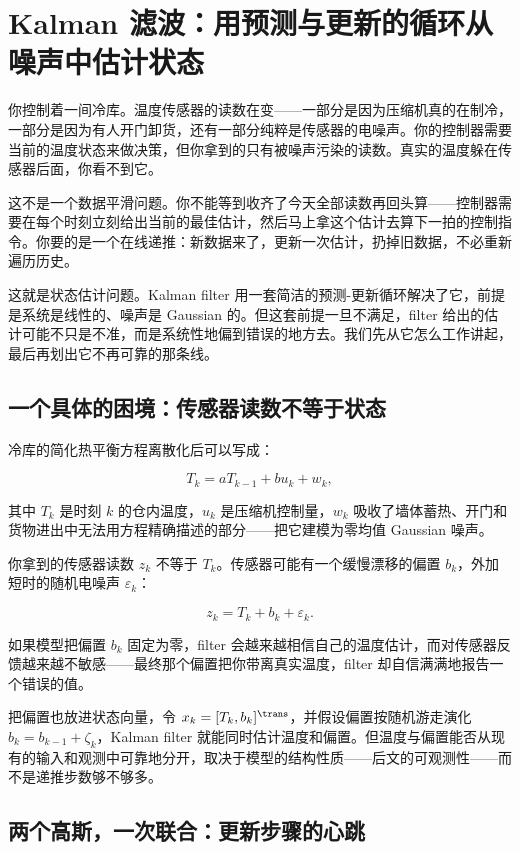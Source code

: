 \section{Kalman 滤波：用预测与更新的循环从噪声中估计状态}
\label{sec:16-Control-and-Reinforcement-Learning/01-Classical-Control/04}

你控制着一间冷库。温度传感器的读数在变——一部分是因为压缩机真的在制冷，一部分是因为有人开门卸货，还有一部分纯粹是传感器的电噪声。你的控制器需要当前的温度状态来做决策，但你拿到的只有被噪声污染的读数。真实的温度躲在传感器后面，你看不到它。

这不是一个数据平滑问题。你不能等到收齐了今天全部读数再回头算——控制器需要在每个时刻立刻给出当前的最佳估计，然后马上拿这个估计去算下一拍的控制指令。你要的是一个在线递推：新数据来了，更新一次估计，扔掉旧数据，不必重新遍历历史。

这就是状态估计问题。Kalman filter 用一套简洁的预测-更新循环解决了它，前提是系统是线性的、噪声是 Gaussian 的。但这套前提一旦不满足，filter 给出的估计可能不只是不准，而是系统性地偏到错误的地方去。我们先从它怎么工作讲起，最后再划出它不再可靠的那条线。

\subsection{一个具体的困境：传感器读数不等于状态}

冷库的简化热平衡方程离散化后可以写成：

\[
T_k = a T_{k-1} + b u_k + w_k,
\]

其中 \(T_k\) 是时刻 \(k\) 的仓内温度，\(u_k\) 是压缩机控制量，\(w_k\) 吸收了墙体蓄热、开门和货物进出中无法用方程精确描述的部分——把它建模为零均值 Gaussian 噪声。

你拿到的传感器读数 \(z_k\) 不等于 \(T_k\)。传感器可能有一个缓慢漂移的偏置 \(b_k\)，外加短时的随机电噪声 \(\varepsilon_k\)：

\[
z_k = T_k + b_k + \varepsilon_k.
\]

如果模型把偏置 \(b_k\) 固定为零，filter 会越来越相信自己的温度估计，而对传感器反馈越来越不敏感——最终那个偏置把你带离真实温度，filter 却自信满满地报告一个错误的值。

把偏置也放进状态向量，令 \(x_k = [T_k, b_k]^{\trans}\)，并假设偏置按随机游走演化 \(b_k = b_{k-1} + \zeta_k\)，Kalman filter 就能同时估计温度和偏置。但温度与偏置能否从现有的输入和观测中可靠地分开，取决于模型的结构性质——后文的可观测性——而不是递推步数够不够多。

\subsection{两个高斯，一次联合：更新步骤的心跳}

